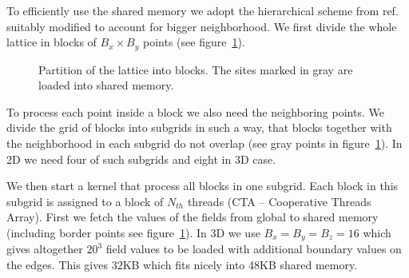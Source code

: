 \documentclass[a4paper]{llncs}
\newcommand{\fillblockgray}[2]{
\pgfmathtruncatemacro\llx{\bksize*(#1)-2}
\pgfmathtruncatemacro\lly{\bksize*(#2)-2}
\pgfmathtruncatemacro\urx{\bksize*(#1+1)+1}
\pgfmathtruncatemacro\ury{\bksize*(#2+1)+1}
\foreach \x in {\llx, ..., \urx}
  \foreach \y in {\lly,...,\ury} {
    \fill[gray] (\x, \y) circle(.25);
  }
}
\newcommand{\npartition}[3]{
\pgfmathtruncatemacro\row{Mod(#2,4)}
\ifnum \row = 0
   \pgfmathtruncatemacro\num{Mod(#1,4)}
\else \ifnum \row  = 1
   \pgfmathtruncatemacro\num{Mod(#1,4)+4}
\else \ifnum \row  = 2
   \pgfmathtruncatemacro\num{Mod(Mod(#1,4)+2,4)}
\else \ifnum \row  = 3
   \pgfmathtruncatemacro\num{Mod(Mod(#1,4)+2,4)+4}
\fi
\fi
\fi
\fi
\ifnum \num = #3
\draw[draw=black,fill=red] (#1, #2) circle(0.4);
\fi

}
\newcommand{\markpartition}[3]{
\pgfmathtruncatemacro\llx{\bksize*(#1)}
\pgfmathtruncatemacro\lly{\bksize*(#2)}
\pgfmathtruncatemacro\urx{\bksize*(#1+1)-1}
\pgfmathtruncatemacro\ury{\bksize*(#2+1)-1}
\foreach \x in {\llx, ..., \urx}
  \foreach \y in {\lly,...,\ury} {
    \npartition{\x}{\y}{#3}
  }
}
\def\bksize{8}
\def\bkcount{4}
\def\lcsize{5}
\begin{document}
To efficiently use the shared memory  we adopt the hierarchical scheme from
ref.~\cite{weigel} suitably modified to account for bigger
neighborhood.  We first divide the whole lattice in blocks of
$B_x\times B_y$ points (see figure~\ref{fig:blocks}). 
\begin{figure} 
\begin{center}

\end{center}
\caption{\label{fig:blocks}Partition of the lattice into
  blocks.  The sites 
marked in gray are loaded into shared memory.}
\end{figure}
To process each point inside a block we also need the neighboring
points.  We divide the grid of blocks into subgrids in such a way,
that blocks together with the neighborhood in each subgrid do not
overlap (see gray points in figure~\ref{fig:blocks}). In 2D we need
four of such subgrids and eight in 3D case.

We then start a kernel that process all blocks in one subgrid.  Each
block in this subgrid is assigned to a block of $N_{th}$ threads (CTA
-- Cooperative Threads Array). First we fetch the values of the fields
from global to shared memory (including border points see
figure~\ref{fig:blocks}).  In 3D we use $B_x=B_y=B_z=16$ which gives
altogether $20^3$ field values to be loaded with additional boundary values on the edges. This gives $32$KB which
fits nicely into 48KB shared memory.
\end{document}
